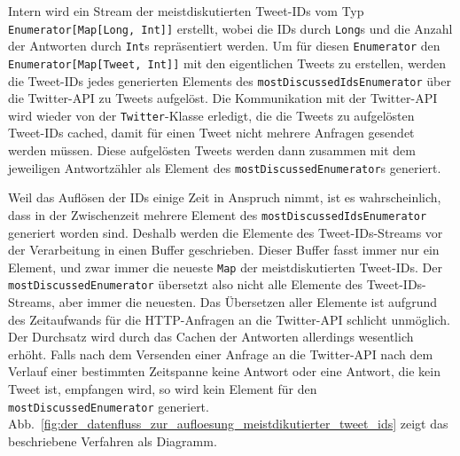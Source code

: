 Intern wird ein Stream der meistdiskutierten Tweet-IDs vom Typ \lstinline|Enumerator[Map[Long, Int]]| erstellt, wobei die IDs durch \lstinline|Long|s und die Anzahl der Antworten durch \lstinline|Int|s repräsentiert werden.
Um für diesen \lstinline|Enumerator| den \lstinline|Enumerator[Map[Tweet, Int]]| mit den eigentlichen Tweets zu erstellen, werden die Tweet-IDs jedes generierten Elements des \lstinline|mostDiscussedIdsEnumerator| über die Twitter-API zu Tweets aufgelöst.
Die Kommunikation mit der Twitter-API wird wieder von der \lstinline|Twitter|-Klasse erledigt, die die Tweets zu aufgelösten Tweet-IDs cached, damit für einen Tweet nicht mehrere Anfragen gesendet werden müssen.
Diese aufgelösten Tweets werden dann zusammen mit dem jeweiligen Antwortzähler als Element des \lstinline|mostDiscussedEnumerator|s generiert.

Weil das Auflösen der IDs einige Zeit in Anspruch nimmt, ist es wahrscheinlich, dass in der Zwischenzeit mehrere Element des \lstinline|mostDiscussedIdsEnumerator| generiert worden sind.
Deshalb werden die Elemente des Tweet-IDs-Streams vor der Verarbeitung in einen Buffer geschrieben.
Dieser Buffer fasst immer nur ein Element, und zwar immer die neueste \lstinline|Map| der meistdiskutierten Tweet-IDs.
Der \lstinline|mostDiscussedEnumerator| übersetzt also nicht alle Elemente des Tweet-IDs-Streams, aber immer die neuesten.
Das Übersetzen aller Elemente ist aufgrund des Zeitaufwands für die HTTP-Anfragen an die Twitter-API schlicht unmöglich.
Der Durchsatz wird durch das Cachen der Antworten allerdings wesentlich erhöht.
Falls nach dem Versenden einer Anfrage an die Twitter-API nach dem Verlauf einer bestimmten Zeitspanne keine Antwort oder eine Antwort, die kein Tweet ist, empfangen wird, so wird kein Element für den \lstinline|mostDiscussedEnumerator| generiert.
Abb.~\ref{fig:der_datenfluss_zur_aufloesung_meistdikutierter_tweet_ids} zeigt das beschriebene Verfahren als Diagramm.

